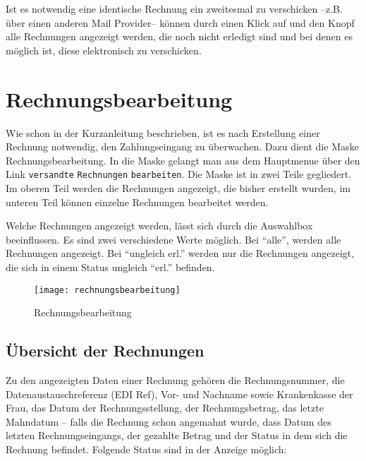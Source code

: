 Ist es notwendig eine identische Rechnung ein zweitesmal zu 
verschicken --z.B. über einen anderen Mail Provider-- 
können durch einen
Klick auf  und den Knopf  alle 
Rechnungen angezeigt werden, die noch nicht erledigt sind und bei denen 
es möglich ist, diese elektronisch zu verschicken.





\section{Rechnungsbearbeitung}\label{rechnungsbearbeitung:kap}
Wie schon in der Kurzanleitung beschrieben, ist es nach Erstellung
einer Rechnung notwendig, den
Zahlungseingang zu überwachen.
 Dazu dient die Maske Rechnungsbearbeitung. In die Maske gelangt
man aus dem Hauptmenue über den Link 
\verb|versandte| \verb|Rechnungen| \verb|bearbeiten|. 
Die Maske ist in zwei Teile
gegliedert. Im oberen Teil werden die Rechnungen angezeigt, die bisher
erstellt wurden, im unteren Teil können einzelne Rechnungen bearbeitet werden.

Welche Rechnungen angezeigt werden, lässt sich durch die Auswahlbox
 beeinflussen. Es sind zwei verschiedene Werte
möglich. Bei ``alle'', werden alle Rechnungen angezeigt. Bei
``ungleich erl.'' werden nur die Rechnungen angezeigt, die sich in einem
Status ungleich ``erl.'' befinden.

\begin{figure}[ht]
\centering
\texttt{[image: rechnungsbearbeitung]}
\caption{Rechnungsbearbeitung\label{rechnungsbearbeitung:fig}}
\end{figure}

\subsection{Übersicht der Rechnungen}
Zu den angezeigten Daten einer Rechnung gehören die Rechnungsnummer,
die Datenaustausch\-referenz (EDI Ref),
Vor- und Nachname sowie Krankenkasse der Frau, das Datum der Rechnungsstellung,
der Rechnungsbetrag, das letzte Mahndatum -- falls die Rechnung schon
angemahnt wurde, dass Datum des letzten Rechnungseingangs, 
der gezahlte Betrag und
der Status in dem sich die Rechnung befindet. Folgende Status sind
in der Anzeige möglich:


